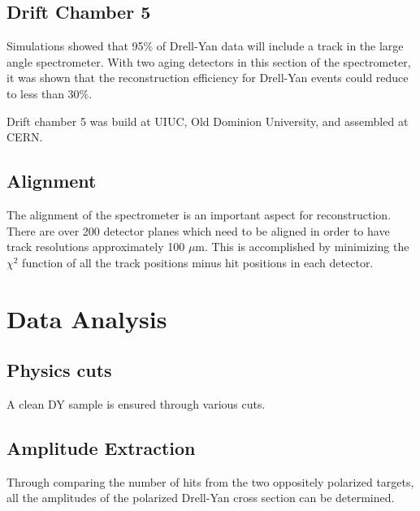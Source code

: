 \documentclass{article}
\begin{document}
\subsection{Drift Chamber 5}
Simulations showed that 95\% of Drell-Yan data will include a track in the large angle spectrometer.  With two aging detectors in this section of the spectrometer, it was shown that the reconstruction efficiency for Drell-Yan events could reduce to less than 30\%.

Drift chamber 5 was build at UIUC, Old Dominion University, and assembled at CERN.

\subsection{Alignment}
The alignment of the spectrometer is an important aspect for reconstruction.  There are over 200 detector planes which need to be aligned in order to have track resolutions approximately 100 $\mu$m.  This is accomplished by minimizing the $\chi^2$ function of all the track positions minus hit positions in each detector.  

\section{Data Analysis}
\subsection{Physics cuts}
A clean DY sample is ensured through various cuts.

\subsection{Amplitude Extraction}
Through comparing the number of hits from the two oppositely polarized targets, all the amplitudes of the polarized Drell-Yan cross section can be determined.  
\end{document}
